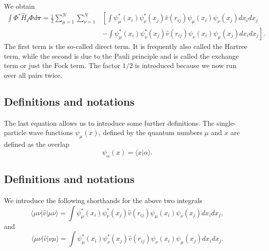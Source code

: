 \documentclass[%
twoside,                 %
final,                   %
10pt]{article}
\begin{document}
\paragraph{}
We obtain
\begin{equation}
\begin{split}
  \int \Phi^*\hat{H}_I\Phi d\mathbf{\tau} 
  = \frac{1}{2}\sum_{\mu=1}^N\sum_{\nu=1}^N
    &\left[ \int \psi_{\mu}^*(x_i)\psi_{\nu}^*(x_j)\hat{v}(r_{ij})\psi_{\mu}(x_i)\psi_{\nu}(x_j)
    dx_idx_j \right.\\
  &\left.
  - \int \psi_{\mu}^*(x_i)\psi_{\nu}^*(x_j)
  \hat{v}(r_{ij})\psi_{\nu}(x_i)\psi_{\mu}(x_j)
  dx_idx_j
  \right]. \label{H2Expectation}
\end{split}
\end{equation}
The first term is the so-called direct term. It is frequently also called the  Hartree term, 
while the second is due to the Pauli principle and is called
the exchange term or just the Fock term.
The factor  $1/2$ is introduced because we now run over
all pairs twice.



\subsection*{Definitions and notations}

\paragraph{}
The last equation allows us to  introduce some further definitions.  
The single-particle wave functions $\psi_{\mu}(x)$, defined by the quantum numbers $\mu$ and $x$
are defined as the overlap 
\[
   \psi_{\alpha}(x)  = \langle x | \alpha \rangle .
\]



\subsection*{Definitions and notations}

\paragraph{}
We introduce the following shorthands for the above two integrals
\[
\langle \mu\nu|\hat{v}|\mu\nu\rangle =  \int \psi_{\mu}^*(x_i)\psi_{\nu}^*(x_j)\hat{v}(r_{ij})\psi_{\mu}(x_i)\psi_{\nu}(x_j)
    dx_idx_j,
\]
and
\[
\langle \mu\nu|\hat{v}|\nu\mu\rangle = \int \psi_{\mu}^*(x_i)\psi_{\nu}^*(x_j)
  \hat{v}(r_{ij})\psi_{\nu}(x_i)\psi_{\mu}(x_j)
  dx_idx_j.  
\]
\end{document}
